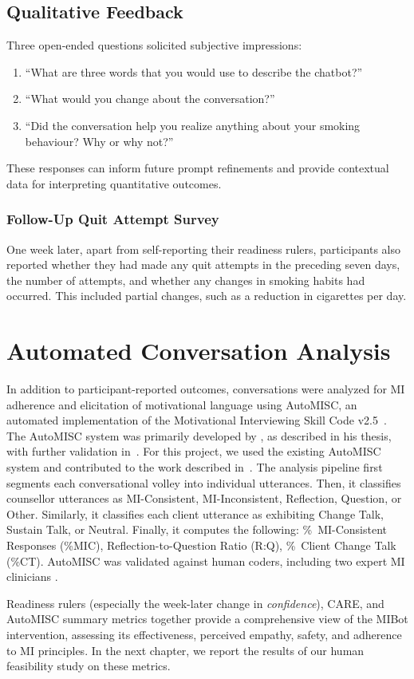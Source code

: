\subsection{Qualitative Feedback}
Three open-ended questions solicited subjective impressions:
\begin{enumerate}
    \item ``What are three words that you would use to describe the chatbot?''
    \item ``What would you change about the conversation?''
    \item ``Did the conversation help you realize anything about your smoking behaviour? Why or why not?''
\end{enumerate}
These responses can inform future prompt refinements and provide contextual data for interpreting quantitative outcomes.

\subsubsection{Follow-Up Quit Attempt Survey}
One week later, apart from self-reporting their readiness rulers, participants also reported whether they had made any quit attempts in the preceding seven days, the number of attempts, and whether any changes in smoking habits had occurred. This included partial changes, such as a reduction in cigarettes per day.

\section{Automated Conversation Analysis}
\label{subsec:automisc}
In addition to participant-reported outcomes, conversations were analyzed for MI adherence and elicitation of motivational language using AutoMISC, an automated implementation of the Motivational Interviewing Skill Code v2.5~\citep{Houck2010}. The AutoMISC system was primarily developed by \citet{ali2025thesis}, as described in his thesis, with further validation in~\citep{ali2025automated}. For this project, we used the existing AutoMISC system and contributed to the work described in~\citep{mahmood-etal-2025-fully}. The analysis pipeline first segments each conversational volley into individual utterances. Then, it classifies counsellor utterances as MI-Consistent, MI-Inconsistent, Reflection, Question, or Other. Similarly, it classifies each client utterance as exhibiting Change Talk, Sustain Talk, or Neutral. Finally, it computes the following: \%~MI-Consistent Responses (\%MIC), Reflection-to-Question Ratio (R:Q), \%~Client Change Talk (\%CT). AutoMISC was validated against human coders, including two expert MI clinicians \citep{mahmood-etal-2025-fully}.

Readiness rulers (especially the week-later change in \emph{confidence}), CARE, and AutoMISC summary metrics together provide a comprehensive view of the MIBot intervention, assessing its effectiveness, perceived empathy, safety, and adherence to MI principles. In the next chapter, we report the results of our human feasibility study on these metrics.
